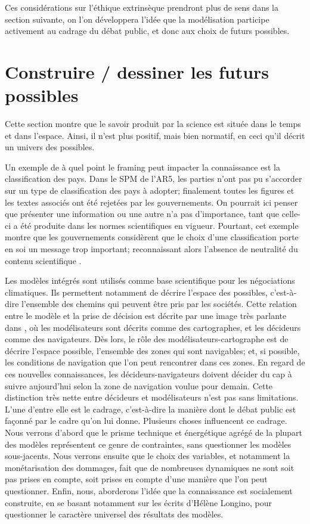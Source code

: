  Ces considérations sur l'éthique extrinsèque prendront plus de sens dans la section suivante, on l'on développera l'idée que la modélisation participe activement au cadrage du débat public, et donc aux choix de futurs possibles. 

\section{Construire / dessiner les futurs possibles}

Cette section montre que le savoir produit par la science est située dans le temps et dans l'espace. Ainsi, il n'est plus positif, mais bien normatif, en ceci qu'il décrit un univers des possibles. 

Un exemple de à quel point le framing peut impacter la connaissance est la classification des pays. Dans le SPM de l'AR5, les parties n'ont pas pu s'accorder sur un type de classification des pays à adopter; finalement toutes les figures et les textes associés ont été rejetées par les gouvernements. On pourrait ici penser que présenter une information ou une autre n'a pas d'importance, tant que celle-ci a été produite dans les normes scientifiques en vigueur. Pourtant, cet exemple montre que les gouvernements considèrent que le choix d'une classification porte en soi un message trop important; reconnaissant alors l'absence de neutralité du contenu scientifique \autocite{edenhofer_mapmakers_2014}. 

Les modèles intégrés sont utilisés comme base scientifique pour les négociations climatiques. Ils permettent notamment de décrire l'espace des possibles, c'est-à-dire l'ensemble des chemins qui peuvent être pris par les sociétés. Cette relation entre le modèle et la prise de décision est décrite par une image très parlante dans \textcite{edenhofer_mapmakers_2014}, où les modélisateurs sont décrits comme des cartographes, et les décideurs comme des navigateurs. Dès lors, le rôle des modélisateurs-cartographe est de décrire l'espace possible, l'ensemble des zones qui sont navigables; et, si possible, les conditions de navigation que l'on peut rencontrer dans ces zones.  En regard de ces nouvelles connaissances, les décideurs-navigateurs doivent décider du cap à suivre aujourd'hui selon la zone de navigation voulue pour demain. Cette distinction très nette entre décideurs et modélisateurs n'est pas sans limitations. L'une d'entre elle est le cadrage, c'est-à-dire la manière dont le débat public est façonné par le cadre qu'on lui donne.  Plusieurs choses influencent ce cadrage. Nous verrons d'abord que le prisme technique et énergétique agrégé de la plupart des modèles représentent ce genre de contraintes, sans questionner les modèles sous-jacents. Nous verrons ensuite que le choix des variables, et notamment la monétarisation des dommages, fait que de nombreuses dynamiques ne sont soit pas prises en compte, soit prises en compte d'une manière que l'on peut questionner. Enfin, nous, aborderons l'idée que la connaissance est socialement construite, en se basant notamment sur les écrits d'Hélène Longino, pour questionner le caractère universel des résultats des modèles. 

